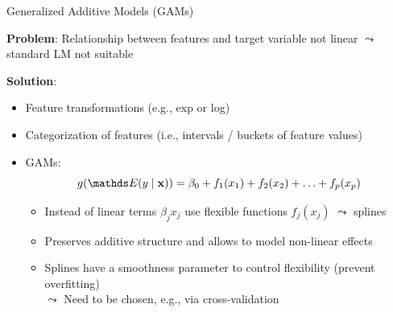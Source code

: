 \documentclass[11pt,compress,t,notes=noshow, aspectratio=169, xcolor=table]{beamer}
\begin{document}

\begin{frame}{Generalized Additive Models (GAMs) }

\textbf{Problem}: Relationship between features and target variable not linear $\leadsto$ standard LM not suitable 

\medskip
\pause
\textbf{Solution}: 
 \begin{itemize}
        \item Feature transformations (e.g., exp or log)
        \item Categorization of features (i.e., intervals / buckets of feature values)
        \item GAMs:
        $$g(\E (y \mid \xv)) = \beta_0 + f_1(x_1) + f_2(x_2) + \ldots + f_p(x_p)$$
    
    \begin{itemize}
        \item Instead of linear terms $\beta_j x_j$ use flexible functions $f_j(x_j)$ $\leadsto$ splines
        \item Preserves additive structure and allows to model non-linear effects
        \item Splines have a smoothness parameter to control flexibility (prevent overfitting)\\
        $\leadsto$ Need to be chosen, e.g., via cross-validation
    \end{itemize}
    \end{itemize}
    
    

   

\end{frame}
\end{document}
